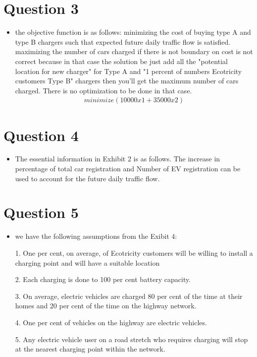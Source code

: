 \documentclass[12pt,letterpaper]{article}
\begin{document}
\section*{Question 3}
\begin{itemize}
    \item the objective function is as follows: minimizing the cost of buying type A and type B chargers such that expected future daily traffic flow is satisfied. \\
    
     maximizing the number of cars charged if there is not boundary on cost is not correct because in that case the solution be just add all the "potential location for new charger" for Type A and  "1 percent of numbers Ecotricity customers Type B" chargers then you'll get the maximum number of cars charged. There is no optimization to be done in that case.
        \begin{align}
            minimize (10000x1 + 35000x2)
        \end{align}
\end{itemize}

\section*{Question 4}
\begin{itemize}
    \item The essential information in Exhibit 2 is as follows.
        The increase in percentage of total car registration and Number of EV registration can be used to account for the future daily traffic flow.
\end{itemize}

\section*{Question 5}
\begin{itemize}
    \item we have the following assumptions from the Exibit 4: \\
    \item[1.]  One per cent, on average, of Ecotricity customers will be willing to install a charging point and will have a suitable location \\
    \item[2.]  Each charging is done to 100 per cent battery capacity. \\
    \item[3.]  On average, electric vehicles are charged 80 per cent of the time at their homes and 20 per cent of the time on the highway network. \\
    \item[4.] One per cent of vehicles on the highway are electric vehicles. \\ 
    \item[5.]  Any electric vehicle user on a road stretch who requires charging will stop at the nearest charging point within the network.
\end{itemize}
\end{document}
